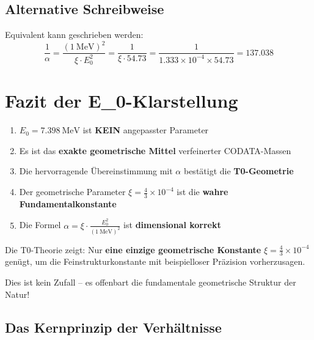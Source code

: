 \documentclass[12pt,a4paper]{article}
\theoremstyle{definition}
\begin{document}
	\subsection{Alternative Schreibweise}
	
	Equivalent kann geschrieben werden:
	\begin{equation}
		\frac{1}{\alpha} = \frac{( \SI{1}{\MeV} )^2}{\xi \cdot E_0^2} = \frac{1}{\xi \cdot 54.73} = \frac{1}{1.333 \times 10^{-4} \times 54.73} = 137.038
	\end{equation}
	
	\section{Fazit der E\_0-Klarstellung}
	
	\begin{tcolorbox}[colback=red!5!white,colframe=red!75!black,title=Zusammenfassung E\_0-Analyse]
		\begin{enumerate}
			\item $E_0 = \SI{7.398}{\MeV}$ ist \textbf{KEIN} angepasster Parameter
			\item Es ist das \textbf{exakte geometrische Mittel} verfeinerter CODATA-Massen
			\item Die hervorragende \"Ubereinstimmung mit $\alpha$ best\"atigt die \textbf{T0-Geometrie}
			\item Der geometrische Parameter $\xi = \frac{4}{3} \times 10^{-4}$ ist die \textbf{wahre Fundamentalkonstante}
			\item Die Formel $\alpha = \xi \cdot \frac{E_0^2}{( \SI{1}{\MeV} )^2}$ ist \textbf{dimensional korrekt}
		\end{enumerate}
	\end{tcolorbox}
	
	\begin{tcolorbox}[colback=green!10!white,colframe=green!75!black,title=Die Revolution\"are E\_0-Erkenntnis]
		Die T0-Theorie zeigt: Nur \textbf{eine einzige geometrische Konstante} $\xi = \frac{4}{3} \times 10^{-4}$ gen\"ugt, um die Feinstrukturkonstante mit beispielloser Pr\"azision vorherzusagen.
		
		Dies ist kein Zufall -- es offenbart die fundamentale geometrische Struktur der Natur!
	\end{tcolorbox}
	
	\subsection{Das Kernprinzip der Verh\"altnisse}
	
\end{document}
